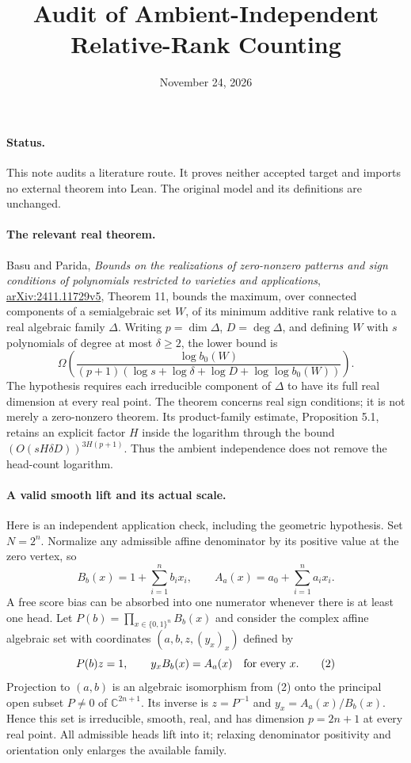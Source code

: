 \documentclass[11pt]{article}
\begin{document}
\title{Audit of Ambient-Independent Relative-Rank Counting}
\author{}
\date{November 24, 2026}
\maketitle

\paragraph{Status.}
This note audits a literature route. It proves neither accepted target
and imports no external theorem into Lean. The original model and its
definitions are unchanged.

\paragraph{The relevant real theorem.}
Basu and Parida, \emph{Bounds on the realizations of zero-nonzero patterns
and sign conditions of polynomials restricted to varieties and applications},
\href{https://arxiv.org/html/2411.11729v5}{arXiv:2411.11729v5}, Theorem 11,
bounds the maximum, over connected components of a semialgebraic set $W$,
of its minimum additive rank relative to a real algebraic family $\Delta$.
Writing $p=\dim\Delta$, $D=\deg\Delta$, and defining $W$ with $s$
polynomials of degree at most $\delta\geq2$, the lower bound is
\[
 \Omega\left(\frac{\log b_0(W)}
 {(p+1)(\log s+\log\delta+\log D+\log\log b_0(W))}\right).
 \tag{1}
\]
The hypothesis requires each irreducible component of $\Delta$ to have
its full real dimension at every real point. The theorem concerns real
sign conditions; it is not merely a zero-nonzero theorem. Its product-family
estimate, Proposition 5.1, retains an explicit factor $H$ inside the
logarithm through the bound
$(O(sH\delta D))^{3H(p+1)}$. Thus the ambient independence does not
remove the head-count logarithm.

\paragraph{A valid smooth lift and its actual scale.}
Here is an independent application check, including the geometric
hypothesis. Set $N=2^n$. Normalize any admissible affine denominator by
its positive value at the zero vertex, so
\[
 B_b(x)=1+\sum_{i=1}^n b_i x_i,
 \qquad A_a(x)=a_0+\sum_{i=1}^n a_i x_i.
\]
A free score bias can be absorbed into one numerator whenever there is
at least one head. Let $P(b)=\prod_{x\in\{0,1\}^n}B_b(x)$ and consider
the complex affine algebraic set with coordinates $(a,b,z,(y_x)_x)$
defined by
\[
 P(b)z=1,\qquad y_x B_b(x)=A_a(x)\quad\hbox{for every }x.
 \tag{2}
\]
Projection to $(a,b)$ is an algebraic isomorphism from (2) onto the
principal open subset $P\neq0$ of $\mathbb C^{2n+1}$. Its inverse is
$z=P^{-1}$ and $y_x=A_a(x)/B_b(x)$. Hence this set is irreducible,
smooth, real, and has dimension $p=2n+1$ at every real point.
All admissible heads lift into it; relaxing denominator positivity and
orientation only enlarges the available family.
\end{document}

